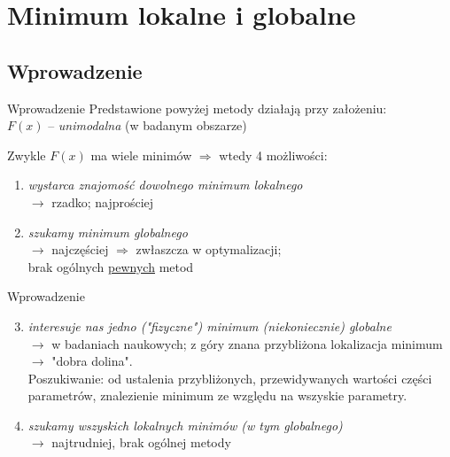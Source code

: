 \section{Minimum lokalne i globalne}

\subsection{Wprowadzenie}

  \begin{frame}{Wprowadzenie}
    Predstawione powyżej metody działają przy założeniu:\\
    $F(x)$ -- \emph{unimodalna} (w badanym obszarze)
    \begin{block}{Zwykle $F(x)$ ma wiele minimów $\Rightarrow$ wtedy 4 możliwości:}
      \begin{enumerate}
        \item \emph{wystarca znajomość dowolnego minimum lokalnego}\\
        $\to$ rzadko; najprościej
        \item \emph{szukamy minimum globalnego}\\
        $\to$ najczęściej $\Rightarrow$ zwłaszcza w optymalizacji;\\
        brak ogólnych \underline{pewnych} metod

      \end{enumerate}
    \end{block}
  \end{frame}

  \begin{frame}{Wprowadzenie}
    \begin{block}{}
      \begin{enumerate}
        \setcounter{enumi}{2}
        \item \emph{interesuje nas jedno ("fizyczne") minimum
        (niekoniecznie) globalne}\\
        $\to$ w badaniach naukowych; z góry znana przybliżona
        lokalizacja minimum $\to$ "dobra dolina". \\
        Poszukiwanie: od ustalenia przybliżonych, przewidywanych
        wartości części parametrów, znalezienie minimum ze
        względu na wszyskie parametry.
        \item \emph{szukamy wszyskich lokalnych minimów
        (w tym globalnego)} \\
        $\to$ najtrudniej, brak ogólnej metody
      \end{enumerate}
    \end{block}
  \end{frame}

